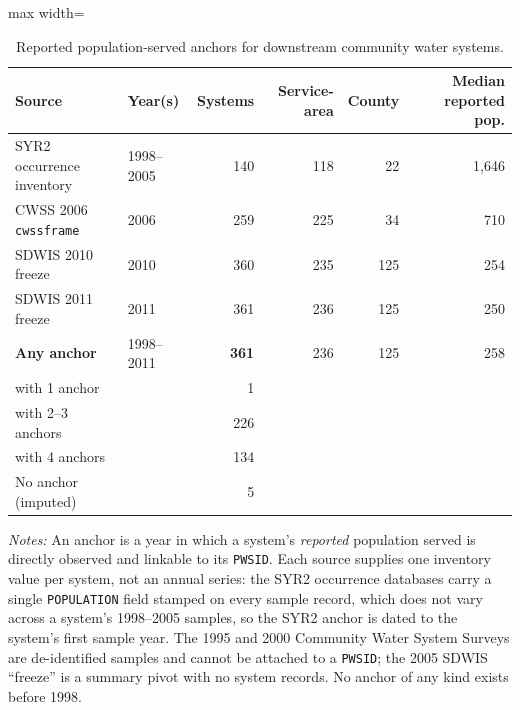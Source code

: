\begin{table}[ht]
\centering
\caption{Reported population-served anchors for downstream community water systems.}
\label{tab:backcast_anchors}
\begin{adjustbox}{max width=\textwidth}
\begin{tabular}{llrrrr}
\toprule
Source & Year(s) & Systems & Service-area & County & Median reported pop. \\
\midrule
SYR2 occurrence inventory & 1998--2005 & 140 & 118 & 22 & 1,646 \\
CWSS 2006 \texttt{cwssframe} & 2006 & 259 & 225 & 34 & 710 \\
SDWIS 2010 freeze & 2010 & 360 & 235 & 125 & 254 \\
SDWIS 2011 freeze & 2011 & 361 & 236 & 125 & 250 \\
\midrule
\textbf{Any anchor} & 1998--2011 & \textbf{361} & 236 & 125 & 258 \\
\quad with 1 anchor & & 1 & & & \\
\quad with 2--3 anchors & & 226 & & & \\
\quad with 4 anchors & & 134 & & & \\
No anchor (imputed) & & 5 & & & \\
\bottomrule
\end{tabular}
\end{adjustbox}
\begin{minipage}{\textwidth}\footnotesize
\vspace{0.5em}
\textit{Notes:} An anchor is a year in which a system's \emph{reported} population served is directly observed and linkable to its \texttt{PWSID}. Each source supplies one inventory value per system, not an annual series: the SYR2 occurrence databases carry a single \texttt{POPULATION} field stamped on every sample record, which does not vary across a system's 1998--2005 samples, so the SYR2 anchor is dated to the system's first sample year. The 1995 and 2000 Community Water System Surveys are de-identified samples and cannot be attached to a \texttt{PWSID}; the 2005 SDWIS ``freeze'' is a summary pivot with no system records. No anchor of any kind exists before 1998.
\end{minipage}
\end{table}
